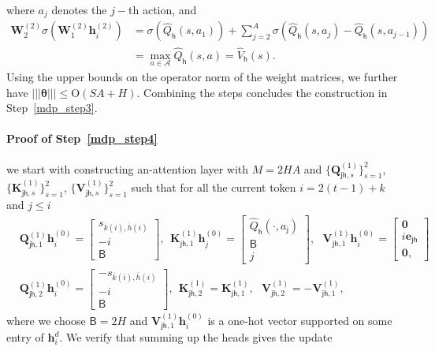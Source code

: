 \documentclass[10pt]{article}
\renewcommand{\bar}{\overline}
\newcommand{\<}{\left\langle}
\renewcommand{\>}{\right\rangle}
\renewcommand{\bQ}{\mathbf{Q}}
\newcommand{\bzero}{{\mathbf 0}}
\newcommand{\nrmp}[1]{{\left|\!\left|\!\left|{#1}\right|\!\right|\!\right|}}
\newcommand{\partd}{{d}}
\newcommand{\state}{{s}}
\newcommand{\action}{{a}}
\newcommand{\horizon}{{H}}
\newcommand{\actionsp}{{\mathcal{A}}}
\renewcommand{\horizon}{{H}}
\newcommand{\valuefun}{{V}}
\newcommand{\tfpar}{{\btheta}}
\newcommand{\head}{{M}}
\newcommand{\tfthres}{{\mathsf{B}}}
\newcommand{\Numst}{{S}}
\newcommand{\Numact}{{A}}
\newcommand{\Qfun}{{Q}}
\newcommand{\estQfun}{{\widehat{\Qfun}}}
\newcommand{\Vfun}{{\valuefun}}
\newcommand{\estVfun}{{\widehat{\Vfun}}}
\newcommand{\conO}{{\mathrm{O}}}
\def\bK{{\mathbf K}}
\def\bQ{{\mathbf Q}}
\def\bV{{\mathbf V}}
\def\bW{{\mathbf W}}
\def\btheta{{\boldsymbol \theta}}
\def\be{{\mathbf e}}
\def\bh{{\mathbf h}}
\def\sj{{\mathsf{j}}}
\def\sh{{\mathsf{h}}}
\begin{document}
 where $\action_j$ denotes the $j-$th action,
 and
 \begin{align*}
  \bW^{(2)}_2\sigma(\bW^{(2)}_1\bh_i^{(2)})
 &=
 \sigma(\estQfun_\sh(\state,\action_1))+\sum_{j=2}^\Numact\sigma( \estQfun_\sh(\state,\action_j)-\estQfun_\sh(\state,\action_{j-1}))\\
 &=\max_{\action\in\actionsp}\estQfun_\sh(\state,\action)=\estVfun_\sh(\state).
 \end{align*}
 Using the upper bounds on the operator norm of the  weight matrices, we further have $\nrmp{\tfpar}\leq\conO(\Numst\Numact+\horizon)$.
Combining the steps concludes the construction in Step~\ref{mdp_step3}.
 \paragraph{Proof of Step~\ref{mdp_step4}}
 we start with constructing an-attention layer with $\head=2\horizon\Numact$ and $\{\bQ_{\sj\sh,s}^{(1)}\}^2_{s=1}$, $\{\bK_{\sj\sh,s}^{(1)}\}^2_{s=1}$, $\{\bV_{\sj\sh,s}^{(1)}\}^2_{s=1}$ such that for all the current token $i= 2(t-1)+k$ and $j\leq i$
\begin{align*}
  & \bQ_{\sj\sh,1}^{(1)}\bh_i^{(0)} =\begin{bmatrix}
       \state_{\bar{k}(i),\bar{h}(i)}\\-i\\
       \tfthres
   \end{bmatrix},~~ \bK_{\sj\sh,1}^{(1)}\bh_j^{(0)} =\begin{bmatrix}
    \estQfun_\sh(\cdot,\action_\sj)\\  \tfthres\\ j
   \end{bmatrix},~~~
   \bV_{\sj\sh,1}^{(1)}\bh_i^{(0)} =\begin{bmatrix}
       \bzero \\ i\be_{\sj\sh}\\
       \bzero,
   \end{bmatrix}
   \\
    &\bQ_{\sj\sh,2}^{(1)}\bh_i^{(0)} =\begin{bmatrix}
       -\state_{\bar{k}(i),\bar{h}(i)}\\-i\\
       \tfthres
   \end{bmatrix},~~ \bK_{\sj\sh,2}^{(1)}=\bK_{\sj\sh,1}^{(1)},~~~
\bV_{\sj\sh,2}^{(1)}=-\bV_{\sj\sh,1}^{(1)},
\end{align*}
where we choose $\tfthres=2\horizon$ and $\bV_{\sj\sh,1}^{(1)}\bh_i^{(0)}$ is a one-hot vector supported on some entry of $\bh_i^\partd$. We verify  that summing up the heads gives the update
\end{document}
